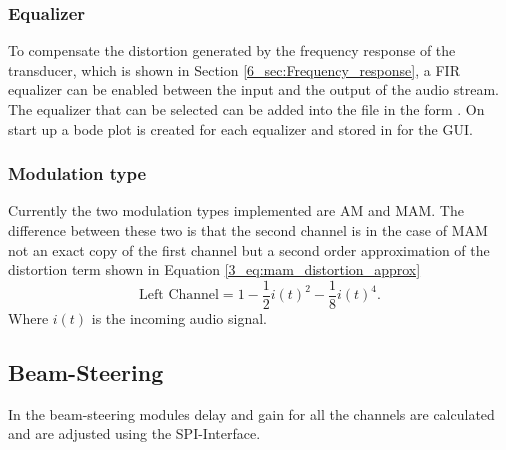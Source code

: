 \subsubsection{Equalizer}
To compensate the distortion generated by the frequency response of the transducer, which is shown in Section \ref{6_sec:Frequency_response}, a FIR equalizer can be enabled between the input and the output of the audio stream. The equalizer that can be selected can be added into the file  in the form . On start up a bode plot is created for each equalizer and stored in  for the GUI.
\subsubsection{Modulation type}
Currently the two modulation types implemented are AM and MAM. The difference between these two is that the second channel is in the case of MAM not an exact copy of the first channel but a second order approximation of the distortion term shown in Equation \ref{3_eq:mam_distortion_approx} 
\begin{equation}
    \text{Left Channel} = 1 - \frac{1}{2}i(t)^2 - \frac{1}{8}i(t)^4.
\end{equation}
Where $i(t)$ is the incoming audio signal. 
\subsection{Beam-Steering}
In the beam-steering modules delay and gain for all the channels are calculated and are adjusted using the SPI-Interface. 

